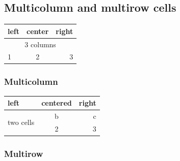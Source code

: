 \subsection{Multicolumn and multirow cells}
\label{sec:tableMultiColumnRow}
\begin{filecontents*}{\democodefile}
\begin{center}
\renewcommand{\arraystretch}{1.4}
\begin{tabular}{|l|c|r|}  
\hline
left  &  center  &  right       \\ \hline
\multicolumn{3}{|c|}{3 columns} \\ \hline
1     &  2       &  3           \\ \hline
\end{tabular}
\end{center}
\end{filecontents*}

\subsubsection{Multicolumn}
\label{sec:multicolumn}

%

\begin{filecontents*}{\democodefile}
\begin{center}
\renewcommand{\arraystretch}{1.4}
\begin{tabular}{|l|c|r|}  \hline
left   &  centered  &  right  \\ \hline
\multirow{2}{*}{two  cells}  
       &  b         &  c      \\ \cline{2-3}
       &  2         &  3      \\ \hline
\end{tabular}
\end{center}
\end{filecontents*}

\subsubsection{Multirow}
\label{sec:multirow}

